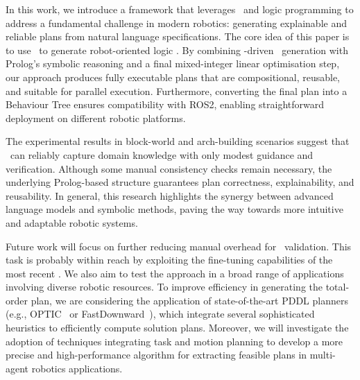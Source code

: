 
In this work, we introduce a framework that leverages \llms\  
and logic programming to address a fundamental challenge in modern  
robotics: generating explainable and reliable plans from natural language  
specifications. The core idea of this paper is to use  
\llms\ to generate robot-oriented logic \kb. By  
combining \llm-driven \kb\ generation with Prolog’s symbolic reasoning  
and a final mixed-integer linear optimisation step, our approach  
produces fully executable plans that are compositional, reusable,  
and suitable for parallel execution. Furthermore, converting the final plan into a Behaviour Tree  
ensures compatibility with ROS2, enabling straightforward deployment  
on different robotic platforms.

The experimental results in block-world and arch-building scenarios  
suggest that \llms\ can reliably capture domain knowledge with only  
modest guidance and verification. Although some manual consistency  
checks remain necessary, the underlying Prolog-based structure  
guarantees plan correctness, explainability, and reusability. In  
general, this research highlights the synergy between advanced  
language models and symbolic methods, paving the way towards more  
intuitive and adaptable robotic systems.  

Future work will focus on further reducing manual overhead for \kb\  
validation. This task is probably within reach by  
exploiting the fine-tuning capabilities of the most recent \llms.  
We also aim to test the approach in a broad range of applications  
involving diverse robotic resources.  
To improve efficiency in generating the total-order plan, we are  
considering the application of state-of-the-art PDDL planners (e.g.,  
OPTIC~\cite{DBLP:conf/aips/BentonCC12} or  
FastDownward~\cite{DBLP:journals/jair/Helmert06}), which integrate  
several sophisticated heuristics to efficiently compute solution  
plans. Moreover, we will investigate the adoption of techniques  
integrating task and motion planning to develop a more precise and  
high-performance algorithm for extracting feasible plans in  
multi-agent robotics applications.  
